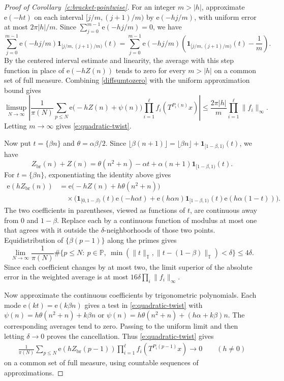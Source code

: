 \documentclass[12pt]{amsart}
\newcommand{\1}{\mathbf 1}
\newcommand{\e}{\mathrm e}
\theoremstyle{definition}
\begin{document}
\begin{proof}[Proof of Corollary~\ref{c:bracket-pointwise}]
For an integer $m>|h|$, approximate $\e(-ht)$ on each interval
$[j/m,(j+1)/m)$ by $\e(-hj/m)$, with uniform error at most
$2\pi|h|/m$. Since $\sum_{j=0}^{m-1}\e(-hj/m)=0$, we have
\[
 \sum_{j=0}^{m-1}\e(-hj/m)\mathbf1_{[j/m,(j+1)/m)}(t)
 =
 \sum_{j=0}^{m-1}\e(-hj/m)
 \left(\mathbf1_{[j/m,(j+1)/m)}(t)-\frac1m\right).
\]
By the centered interval estimate and linearity, the average
with this step function in place of $\e(-hZ(n))$ tends to zero
for every $m>|h|$ on a common set of full measure. Combining \eqref{diffsumtozero} with the uniform approximation
bound gives
\[
 \limsup_{N\to\infty}
 \left|
 \frac1{\pi(N)}\sum_{p\leq N}
 \e\bigl(-hZ(n)+\psi(n)\bigr)
 \prod_{i=1}^{\ell}f_i(T^{P_i(n)}x)
 \right|
 \leq \frac{2\pi|h|}{m}\prod_{i=1}^{\ell}\|f_i\|_\infty.
\]
Letting $m\to\infty$ gives \eqref{e:quadratic-twist}.

Now put $t=\{\beta n\}$ and $\theta=\alpha\beta/2$. Since
$\lfloor\beta(n+1)\rfloor=\lfloor\beta n\rfloor+
\mathbf1_{[1-\beta,1)}(t)$, we have
\[
 Z_{\mathrm{br}}(n)+Z(n)
 =\theta(n^2+n)-\alpha t
  +\alpha(n+1)\mathbf1_{[1-\beta,1)}(t).
\]
For $t=\{\beta n\}$, exponentiating the identity above gives
\begin{align*}
 \e(hZ_{\mathrm{br}}(n))
 &=\e\bigl(-hZ(n)+h\theta(n^2+n)\bigr)\\
 &\quad\times\bigl(
 \mathbf1_{[0,1-\beta)}(t)\e(-h\alpha t)
 +\e(h\alpha n)\mathbf1_{[1-\beta,1)}(t)\e(h\alpha(1-t))
 \bigr).
\end{align*}
The two coefficients in parentheses, viewed as functions of $t$,
are continuous away from $0$ and $1-\beta$. Replace each by a
continuous function of modulus at most one that agrees with it
outside the $\delta$-neighborhoods of those two points.
Equidistribution of $\{\beta(p-1)\}$ along the primes gives
\[
 \lim_{N\to\infty}\frac1{\pi(N)}
 \#\{p\leq N:\ p\in\mathbb P,\
       \min(\|t\|_{\mathbb T},\|t-(1-\beta)\|_{\mathbb T})<\delta\}
 \leq 4\delta.
\]
Since each coefficient changes by at most two, the limit superior
of the absolute error in the weighted average is at most
$16\delta\prod_i\|f_i\|_\infty$.

Now approximate the continuous coefficients by trigonometric
polynomials. Each mode $\e(kt)=\e(k\beta n)$ gives a test in
\eqref{e:quadratic-twist} with
$\psi(n)=h\theta(n^2+n)+k\beta n$ or
$\psi(n)=h\theta(n^2+n)+(h\alpha+k\beta)n$.
The corresponding averages tend to zero. Passing to the uniform
limit and then letting $\delta\to0$ proves the cancellation. Thus \eqref{e:quadratic-twist} gives
\begin{align}\label{e:limitofprimesexp}
    \frac1{\pi(N)}\sum_{p\leq N}\e(hZ_{\mathrm{br}}(p-1))
 \prod_{i=1}^{\ell}f_i(T^{P_i(p-1)}x)
 \longrightarrow 0
 \qquad(h\ne0)
\end{align}
on a common set of full measure, using countable sequences of
approximations.


\end{proof}
\end{document}
